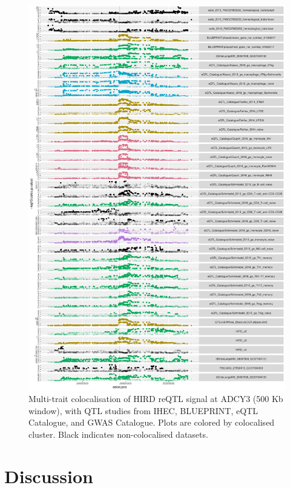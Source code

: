\begin{figure}
    \centering
    \includegraphics[width=1.0\textwidth,page=1]{mainmatter/figures/chapter_03/perform_coloc.locusPlot.gene_ENSG00000138031.pdf}
    \caption{Multi-trait colocalisation of HIRD reQTL signal at ADCY3 (500 Kb window), with QTL studies from IHEC, BLUEPRINT, eQTL Catalogue, and GWAS Catalogue. Plots are colored by colocalised cluster. Black indicates non-colocalised datasets.}
    \label{fig:hird_eQTL_coloc_ADCY3}
\end{figure}

\section{Discussion}

